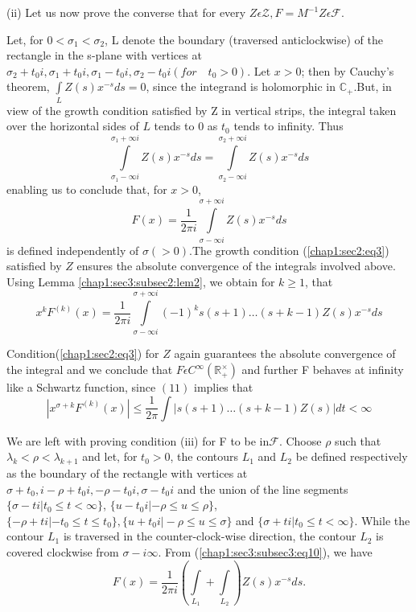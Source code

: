  (ii) Let us now prove the converse that for every
  $Z\epsilon \mathscr{Z}, F=M^{-1}$\break  $Z\epsilon \mathscr{F}$. 

  Let, for
  $0<\sigma_{1}<\sigma_{2}$, L denote the boundary (traversed
  anticlockwise) of the rectangle in the s-plane with vertices at
  $\sigma_{2}+t_{0}i,\sigma_{1}+t_{0}i,\sigma_{1}-t_{0}i,\sigma_{2}-t_{0}i(for\quad
  t_{0}>0)$. Let $x>0$; then by Cauchy's theorem,
  $\int\limits_{L}Z(s)x^{-s}ds=0$, since the integrand is holomorphic
  in $\mathbb{C}_{+}$.But, in view of the growth condition  satisfied
  by Z in vertical strips, the integral taken over the horizontal
  sides of $L$ tends to $0$ as $t_{0}$ tends to infinity. Thus
\begin{equation*}
\int\limits_{\sigma_{1}-\infty i}^{\sigma_{1}+\infty
  i}Z(s)x^{-s}ds=\int\limits_{\sigma_{2}-\infty i}^{\sigma_{2}+\infty i}Z(s)x^{-s}ds
\end{equation*}
enabling us to conclude that, for $x>0$,
\begin{equation*}
  F(x)=\frac{1}{2\pi i}\int\limits_{\sigma-\infty i}^{\sigma+\infty
    i}Z(s)x^{-s}ds\tag{10}\label{chap1:sec3:subsec3:eq10} 
\end{equation*}
is defined independently of $\sigma(>0)$.The growth condition
(\ref{chap1:sec2:eq3}) 
satisfied by $Z$ ensures the absolute convergence of the integrals
involved above. Using Lemma \ref{chap1:sec3:subsec2:lem2}, we obtain
for $k\ge 1$, that 
\begin{equation*}
x^{k}F^{(k)}(x)=\frac{1}{2\pi i}\int\limits_{\sigma-\infty
  i}^{\sigma+\infty i}(-1)^k
s(s+1)\ldots(s+k-1)Z(s)x^{-s}ds\tag{11}\label{chap1:sec3:subsec3:eq11} 
\end{equation*}

Condition\pageoriginale (\ref{chap1:sec2:eq3}) for $Z$ again guarantees the absolute
convergence of the 
integral and we conclude that $F\epsilon
C^{\infty}(\mathbb{R}_{+}^\times)$ and further F behaves at infinity like
a Schwartz function, since $(11)$ implies that 
\begin{equation*}
  |x^{\sigma+ k} F^{(k)}(x)|\le
  \frac{1}{2\pi}\int\limits|s(s+1)\ldots(s+k-1)Z(s)|dt<\infty
\end{equation*}

We are left with proving condition (iii) for F to be
in$\mathscr{F}$. Choose $\rho$ such that
$\lambda_{k}<\rho<\lambda_{k+1}$ and let, for $t_{0}>0$, the contours
$L_{1}$ and  $L_{2}$  be defined respectively as the boundary of the
rectangle with vertices at $\sigma+t_0, i-\rho+t_{0}i,-\rho
-t_{0}i,\sigma-t_{0}i$ and the union of the line segments
$\{\sigma-ti|t_{0}\le t<\infty\}$, $\{u-t_{0}i|-\rho\le u\le \rho\}$,
$\{-\rho+ti|-t_{0}\le t\le t_{0}\}, \{u+t_{0}i|-\rho\le u\le \sigma\}$ and
$\{\sigma+ti|t_{0}\le t<\infty\}$. While the contour $L_{1}$ is traversed
in the counter-clock-wise direction, the contour $L_{2}$ is covered
clockwise from $\sigma-i\infty$. From (\ref{chap1:sec3:subsec3:eq10}), we have
\begin{equation*}
F(x)=\frac{1}{2\pi i}(\int\limits_{L_{1}}+\int\limits_{L_{2}})Z(s)x^{-s}ds.
\end{equation*}

